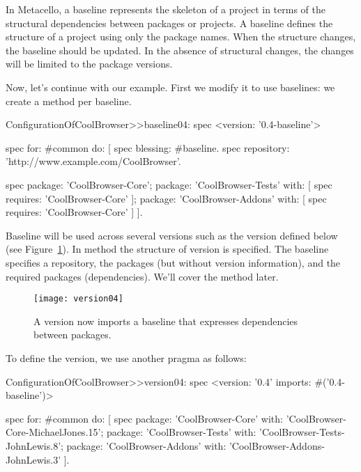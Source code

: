 \documentclass[a4paper,10pt,twoside]{book}
\begin{document}
In Metacello, a baseline represents the skeleton of a project in terms of the structural dependencies between packages or projects. A baseline defines the structure of a project using only the package names. When the structure changes, the baseline should be updated. In the absence of structural changes, the changes will be limited to the package versions.

Now, let's continue with our example. First we modify it to use baselines: we create a method per baseline. 

\begin{code}{}
ConfigurationOfCoolBrowser>>baseline04: spec 
	<version: '0.4-baseline'>
	
	spec for: #common do: [
		spec blessing: #baseline.
		spec repository: 'http://www.example.com/CoolBrowser'.
		
		spec 
			package: 'CoolBrowser-Core';
			package: 'CoolBrowser-Tests' with: [ spec requires: 'CoolBrowser-Core' ];
			package: 'CoolBrowser-Addons' with: [ spec requires: 'CoolBrowser-Core' ] ].

\end{code}

Baseline  will be used across several versions such as the version  defined below (see Figure~\ref{fig:version04}). In method  the structure of version  is specified. The baseline specifies a repository, the packages (but without version information), and the required packages (dependencies). We'll cover the  method  later.

\begin{figure}
\begin{center}
\texttt{[image: version04]}
\caption{A version now imports a baseline that expresses dependencies between packages.\label{fig:version04}}
\end{center}
\end{figure} 

To define the version, we use another pragma  as follows:

\begin{code}{}
ConfigurationOfCoolBrowser>>version04: spec 
	<version: '0.4' imports: #('0.4-baseline')>
	
	spec for: #common do: [
		spec 
			package: 'CoolBrowser-Core' with: 'CoolBrowser-Core-MichaelJones.15';
			package: 'CoolBrowser-Tests' with: 'CoolBrowser-Tests-JohnLewis.8';
			package: 'CoolBrowser-Addons' with: 'CoolBrowser-Addons-JohnLewis.3' ].
\end{code}
\end{document}
